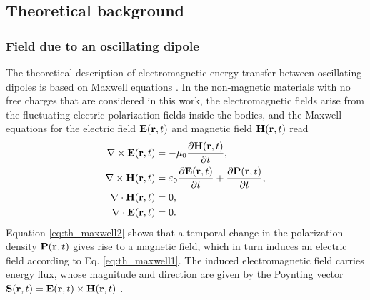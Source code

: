 \subsection{Theoretical background}

\subsubsection{Field due to an oscillating dipole}

The theoretical description of electromagnetic energy transfer between oscillating dipoles is based on Maxwell equations \cite{novotny}. In the non-magnetic materials with no free charges that are considered in this work, the electromagnetic fields arise from the fluctuating electric polarization fields inside the bodies, and the Maxwell equations for the electric field $\mathbf{E}(\mathbf{r},t)$ and magnetic field $\mathbf{H}(\mathbf{r},t)$ read \cite{novotny}
\begin{subequations}
\begin{align}
  \nabla \times \mathbf{E}(\mathbf{r},t) &= - \mu_0 \frac{\partial \mathbf{H}(\mathbf{r},t)}{\partial t}, \label{eq:th_maxwell1} \\
  \nabla \times \mathbf{H}(\mathbf{r},t) &= \varepsilon_0 \frac{\partial \mathbf{E}(\mathbf{r},t)}{\partial t} + \frac{\partial \mathbf{P}(\mathbf{r},t)}{\partial t}, \label{eq:th_maxwell2} \\
   \nabla \cdot \mathbf{H}(\mathbf{r},t) &= 0, \\
   \nabla \cdot \mathbf{E}(\mathbf{r},t) &= 0.
\end{align}
\end{subequations}
Equation \eqref{eq:th_maxwell2} shows that a temporal change in the polarization density $\mathbf{P}(\mathbf{r},t)$ gives rise to a magnetic field, which in turn induces an electric field according to Eq. \eqref{eq:th_maxwell1}. The induced electromagnetic field carries energy flux, whose magnitude and direction are given by the Poynting vector $\mathbf{S}(\mathbf{r},t)=\mathbf{E}(\mathbf{r},t)\times \mathbf{H}(\mathbf{r},t)$ \cite{novotny}.

